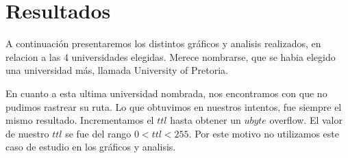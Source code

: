 \section{Resultados}
A continuaci\'on presentaremos los distintos gr\'aficos y analisis realizados, en relacion a las 4 universidades elegidas. Merece nombrarse, que se habia elegido una universidad m\'as, llamada University of Pretoria.

En cuanto a esta ultima universidad nombrada, nos encontramos con que no pudimos rastrear su ruta. Lo que obtuvimos en nuestros intentos, fue siempre el mismo resultado. Incrementamos el $ttl$ hasta obtener un $ubyte$ overflow. El valor de nuestro $ttl$ se fue del rango $0 < ttl < 255$.
Por este motivo no utilizamos este caso de estudio en los gr\'aficos y analisis.






